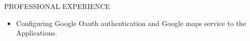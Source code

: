 \documentclass{resume} %
\begin{document}
\begin{rSection}{PROFESSIONAL EXPERIENCE}
\begin{rSubsection}
\begin{itemize}
    \item Configuring Google Oauth authentication and Google
      maps service to the Applications.

    \end{itemize}






    

    

    
    

\end{rSubsection}
\end{rSection}
\end{document}
